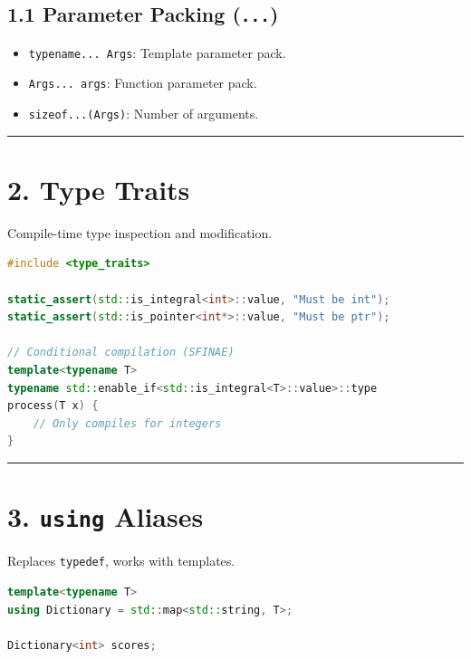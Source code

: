 \hypertarget{parameter-packing-...}{%
\subsection{\texorpdfstring{1.1 Parameter Packing
(\texttt{...})}{1.1 Parameter Packing (...)}}\label{parameter-packing-...}}

\begin{itemize}
\tightlist
\item
  \passthrough{\lstinline!typename... Args!}: Template parameter pack.
\item
  \passthrough{\lstinline!Args... args!}: Function parameter pack.
\item
  \passthrough{\lstinline!sizeof...(Args)!}: Number of arguments.
\end{itemize}

\begin{center}\rule{0.5\linewidth}{0.5pt}\end{center}

\hypertarget{type-traits}{%
\section{2. Type Traits}\label{type-traits}}

Compile-time type inspection and modification.

\begin{lstlisting}[language={C++}]
#include <type_traits>

static_assert(std::is_integral<int>::value, "Must be int");
static_assert(std::is_pointer<int*>::value, "Must be ptr");

// Conditional compilation (SFINAE)
template<typename T>
typename std::enable_if<std::is_integral<T>::value>::type
process(T x) {
    // Only compiles for integers
}
\end{lstlisting}

\begin{center}\rule{0.5\linewidth}{0.5pt}\end{center}

\hypertarget{using-aliases}{%
\section{\texorpdfstring{3. \texttt{using}
Aliases}{3. using Aliases}}\label{using-aliases}}

Replaces \passthrough{\lstinline!typedef!}, works with templates.

\begin{lstlisting}[language={C++}]
template<typename T>
using Dictionary = std::map<std::string, T>;

Dictionary<int> scores;
\end{lstlisting}

